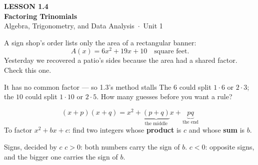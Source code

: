 \documentclass[aspectratio=169, 11pt]{beamer}
\begin{document}
{
\begin{frame}[plain]
  \vspace{2.8cm}\hspace{0.55cm}%
  \begin{minipage}{0.9\textwidth}
    {\color{goldacc}\bfseries\small LESSON 1.4}\\[0.5cm]
    {\color{white}\bfseries\LARGE Factoring Trinomials}\\[1.2cm]
    {\color{mistmid}\small Algebra, Trigonometry, and Data Analysis~$\cdot$~Unit 1}
  \end{minipage}
\end{frame}
}

\begin{frame}[t, plain]
  A sign shop's order lists only the area of a rectangular banner:
  \[ A(x) = 6x^2+19x+10 \quad \text{square feet.} \]
  Yesterday we recovered a patio's sides because the area had a shared factor. Check this one.
  \begin{block}{It has no common factor --- so 1.3's method stalls}
    The $6$ could split $1 \cdot 6$ or $2 \cdot 3$; the $10$ could split $1 \cdot 10$ or
    $2 \cdot 5$. How many guesses before you want a rule?
  \end{block}
\end{frame}

\begin{frame}[t, plain]
  \[ (x+p)(x+q) = x^2 + \underbrace{(p+q)}_{\text{the middle}}x + \underbrace{pq}_{\text{the end}} \]
  To factor $x^2+bx+c$: find two integers whose \textbf{product} is $c$ and whose \textbf{sum}
  is $b$.
  \begin{block}{Signs, decided by $c$}
    $c>0$: both numbers carry the sign of $b$. \quad $c<0$: opposite signs, and the bigger one
    carries the sign of $b$.
  \end{block}
\end{frame}
\end{document}
